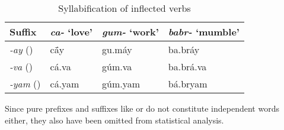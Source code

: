 \begin{table}[h]
\label{ex:verbsyll}
\caption{Syllabification of inflected verbs}
\begin{tabu} to \linewidth {X[2l] X[3c] X[3c] X[3c]}
\toprule\tableheaderfont
Suffix
	& \emph{ca-} `love'
	& \emph{gum-} `work'
	& \emph{babr-} `mumble'
	\\

\toprule

\emph{-ay} (\Fsg{})
	& cā́y
	& gu.máy
	& ba.bráy
	\\

\emph{-va} (\Ssg{})
	& cá.va
	& gúm.va
	& ba.brá.va
	\\

\emph{-yam} (\Ptcp{})
	& cá.yam
	& gúm.yam
	& bá.bryam
	\\

\bottomrule
\end{tabu}
\end{table}

Since pure prefixes and suffixes like  or 
 do not constitute independent words either, 
they also have been omitted from statistical analysis.
